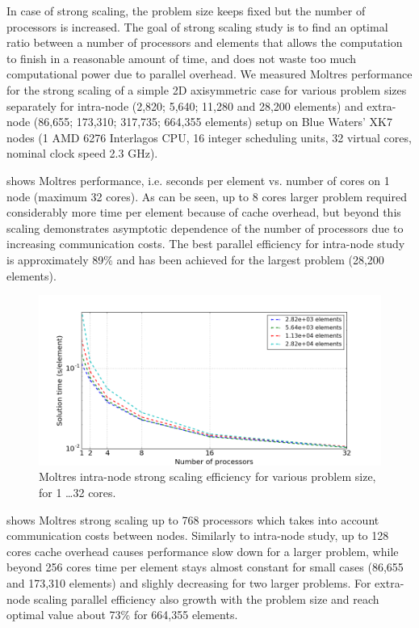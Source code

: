 \documentclass{article}
\makeatletter
\def\maxwidth#1{\ifdim\Gin@nat@width>#1 #1\else\Gin@nat@width\fi}
\makeatother
\begin{document}
In case of strong scaling, the problem size keeps fixed but the number of processors is increased. 
The goal of strong scaling study is to find an optimal ratio between a number of processors and elements 
that allows the computation to finish in a reasonable amount of time, and does not waste too much computational
 power due to parallel overhead. We measured Moltres performance for the strong scaling of a simple 2D 
axisymmetric case for various problem sizes separately for intra-node (2,820; 5,640; 11,280 and 28,200 elements) 
and extra-node (86,655; 173,310; 317,735; 664,355 elements) setup on Blue Waters' XK7 nodes (1 AMD 6276 Interlagos 
CPU, 16 integer scheduling units, 32 virtual cores, nominal clock speed 2.3 GHz). 

 shows Moltres performance, i.e. seconds per element vs. number of cores on 1 node
 (maximum 32 cores). As can be seen, up to 8 cores larger problem required considerably more time per element 
 because of cache overhead, but beyond this scaling demonstrates asymptotic dependence of the number of processors 
 due to increasing communication costs. The best parallel efficiency for intra-node study is approximately 89\% and 
 has been achieved for the largest problem (28,200 elements). 

\begin{figure}[htpb]
  \centering
  \includegraphics[width=\maxwidth{\textwidth}]{intra-node_strong.png}
  \caption{Moltres intra-node strong scaling efficiency for various problem size, for 1 \ldots 32 cores.}
  \label{fig:intra_strong_scaling}
\end{figure}

 shows Moltres strong scaling up to 768 processors which takes into account communication costs 
between nodes. Similarly to intra-node study, up to 128 cores cache overhead causes performance slow down for a larger problem, 
while beyond 256 cores time per element stays almost constant for small cases (86,655 and 173,310 elements) and slighly 
decreasing for two larger problems. For extra-node scaling parallel efficiency also growth with the problem size and reach 
optimal value about 73\% for 664,355 elements.
\end{document}

